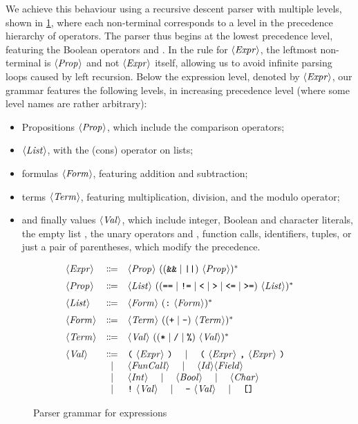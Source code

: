 We achieve this behaviour using a recursive descent parser with multiple levels,
shown in \cref{fig:new-expr-grammar}, where each non-terminal corresponds to a
level in the precedence hierarchy of operators.
%
The parser thus begins at the lowest precedence level, featuring the Boolean
operators \code{\&\&} and \code{||}.
In the rule for $\langle \textit{Expr}\kern.7pt \rangle$, the leftmost non-terminal is $\langle \textit{Prop}\kern.7pt \rangle$ and not
$\langle \textit{Expr}\kern.7pt \rangle$ itself, allowing us to avoid infinite parsing loops caused by left
recursion.
%
Below the expression level, denoted by $\langle \textit{Expr}\kern.7pt \rangle$, our grammar
features the following levels, in increasing precedence level (where some level
names are rather arbitrary):
\begin{itemize}
  \item Propositions $\langle \textit{Prop}\kern.7pt \rangle$, which include the comparison operators;
  \item $\langle \textit{List}\kern.7pt \rangle$, with the \spl{:} (cons) operator on lists;
  \item formulas $\langle \textit{Form}\kern.7pt \rangle$, featuring addition and subtraction;
  \item terms $\langle \textit{Term}\kern.7pt \rangle$, featuring multiplication, division, and the modulo
        operator;
  \item and finally values $\langle \textit{Val}\kern.7pt \rangle$, which include integer, Boolean and
        character literals, the empty list \spl{[]}, the unary operators \spl{!}
        and \spl{-}, function calls, identifiers, tuples, or just a pair of
        parentheses, which modify the precedence.
\end{itemize}

\begin{figure}[th]
  \[
  \begin{array}{lcl}
		\NT{Expr} & \Coloneqq & \NT{Prop}\ ((\code{\&\&} \mid \code{||})\ \NT{Prop})^* \br
		\NT{Prop} & \Coloneqq & \NT{List}\ ((\code{==} \mid \code{!=} \mid \code{<} \mid \code{>} \mid \code{<=} \mid \code{>=})\ \NT{List})^* \br
		\NT{List} & \Coloneqq & \NT{Form}\ (\code{:}\ \NT{Form})^* \br
		\NT{Form} & \Coloneqq & \NT{Term}\ (( \code{+} \mid \code{-} )\ \NT{Term})^* \br
		\NT{Term} & \Coloneqq & \NT{Val}\ (( \code{*} \mid \code{/} \mid \code{\%} )\ \NT{Val} )^* \br
		\NT{Val} & \Coloneqq & \code{(}\ \NT{Expr}\ \code{)} \ruleSep
      \code{(}\ \NT{Expr}\ \code{,}\ \NT{Expr}\ \code{)} \\
		& \mid & \NT{FunCall} \ruleSep
      \NT{Id} \NT{Field} \\
    & \mid & \NT{Int} \ruleSep \NT{Bool} \ruleSep \NT{Char} \\
		& \mid & \code{!}\ \NT{Val} \ruleSep \code{-}\ \NT{Val} \ruleSep \code{[]}
  \end{array}
  \]
  \caption{Parser grammar for expressions}
  \label{fig:new-expr-grammar}
\end{figure}
%


